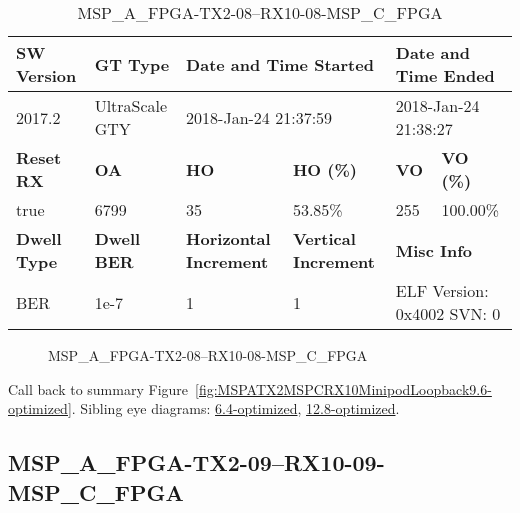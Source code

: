 \begin{table}[h]
\centering
\caption{MSP\_A\_FPGA-TX2-08--RX10-08-MSP\_C\_FPGA}
\label{tab:MSPAFPGATX208RX1008MSPCFPGA9.6-optimized}
\begin{tabular}{@{}|l|l|l|l|l|l|@{}}
\toprule
\textbf{SW Version}                & \textbf{GT Type}   & \multicolumn{2}{l|}{\textbf{Date and Time Started}}            & \multicolumn{2}{l|}{\textbf{Date and Time Ended}}        \\ \midrule
2017.2                       & UltraScale GTY          & \multicolumn{2}{l|}{2018-Jan-24 21:37:59}                   & \multicolumn{2}{l|}{2018-Jan-24 21:38:27}               \\ \midrule
\textbf{Reset RX}                  & \textbf{OA} & \textbf{HO}   & \textbf{HO (\%)} & \textbf{VO} & \textbf{VO (\%)} \\ \midrule
true & 6799        & 35          & 53.85\%        & 255        & 100.00\%       \\ \midrule
\textbf{Dwell Type}                & \textbf{Dwell BER} & \textbf{Horizontal Increment} & \textbf{Vertical Increment}    & \multicolumn{2}{l|}{\textbf{Misc Info}}                  \\ \midrule
BER                            & 1e-7        & 1        & 1           & \multicolumn{2}{l|}{ELF Version: 0x4002 SVN: 0}                         \\ \bottomrule
\end{tabular}
\end{table}

\begin{figure}[h]
\caption{MSP\_A\_FPGA-TX2-08--RX10-08-MSP\_C\_FPGA} \label{fig:MSPAFPGATX208RX1008MSPCFPGA9.6-optimized}
\end{figure}

Call back to summary Figure~\ref{fig:MSPATX2MSPCRX10MinipodLoopback9.6-optimized}.
Sibling eye diagrams: \hyperref[sec:MSPAFPGATX208RX1008MSPCFPGA6.4-optimized]{6.4-optimized}, \hyperref[sec:MSPAFPGATX208RX1008MSPCFPGA12.8-optimized]{12.8-optimized}.

\clearpage
\newpage


\subsection{MSP\_A\_FPGA-TX2-09--RX10-09-MSP\_C\_FPGA}\label{sec:MSPAFPGATX209RX1009MSPCFPGA9.6-optimized}

